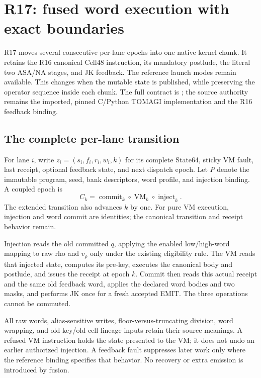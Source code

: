 \section{R17: fused word execution with exact boundaries}
\label{sec:r17-fused}

R17 moves several consecutive per-lane epochs into one native kernel
chunk. It retains the R16 canonical Cell48 instruction, its mandatory
postlude, the literal two ASA/NA stages, and JK feedback. The reference
launch modes remain available. This changes when the mutable state is
published, while preserving the operator sequence inside each chunk.
The full contract is ; the source
authority remains the imported, pinned C/Python TOMAGI implementation
and the R16 feedback binding.

\subsection{The complete per-lane transition}

For lane $i$, write $z_i=(s_i,f_i,r_i,w_i,k)$ for its complete State64,
sticky VM fault, last receipt, optional feedback state, and next dispatch
epoch. Let $P$ denote the immutable program, seed, bank descriptors,
word profile, and injection binding. A coupled epoch is
\begin{equation}
 C_k=\operatorname{commit}_k\circ\operatorname{VM}_k
                         \circ\operatorname{inject}_k.
 \label{eq:r17-composition}
\end{equation}
The extended transition also advances $k$ by one. For pure VM execution,
injection and word commit are identities; the canonical transition and
receipt behavior remain.

Injection reads the old committed $q$, applying the enabled low/high-word
mapping to raw rho and $v_\rho$ only under the existing eligibility rule.
The VM reads that injected state, computes its pre-key, executes the
canonical body and postlude, and issues the receipt at epoch $k$.
Commit then reads this actual receipt and the same old feedback word,
applies the declared word bodies and two masks, and performs JK once
for a fresh accepted EMIT. The three operations cannot be commuted.

All raw words, alias-sensitive writes, floor-versus-truncating division,
word wrapping, and old-key/old-cell lineage inputs retain their source
meanings. A refused VM instruction holds the state presented to the VM;
it does not undo an earlier authorized injection. A feedback fault
suppresses later work only where the reference binding specifies that
behavior. No recovery or extra emission is introduced by fusion.

